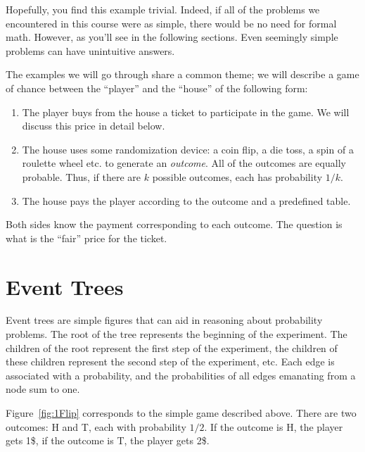 Hopefully, you find this example trivial. Indeed, if all of the
problems we encountered in this course were as simple, there would be
no need for formal math. However, as you'll see in the following
sections. Even seemingly simple problems can have unintuitive answers.

The examples we will go through share a common theme; we will describe
a game of chance between the ``player'' and the ``house'' of the following form:
\begin{enumerate}
\item The player buys from the house a ticket to participate in the
  game. We will discuss this price in detail below.
\item The house uses some randomization device: a coin flip, a die
  toss, a spin of a roulette wheel etc. to generate an {\em
    outcome}. All of the outcomes are equally probable. Thus, if there
  are $k$ possible outcomes, each has probability $1/k$.
\item The house pays the player according to the outcome and a
  predefined table.
\end{enumerate}

Both sides know the payment corresponding to each outcome. The
question is what is the ``fair'' price for the ticket.

\section{Event Trees}

Event trees are simple figures that can aid in reasoning about
probability problems. The root of the tree represents the beginning of
the experiment. The children of the root represent the first step of
the experiment, the children of these children represent the second
step of the experiment, etc.  Each edge is associated with a
probability, and the probabilities of all edges emanating from a node
sum to one.

Figure~\ref{fig:1Flip} corresponds to the simple game described
above. There are two outcomes: H and T, each with probability
$1/2$. If the outcome is H, the player gets 1\$, if the outcome is T,
the player gets 2\$.

